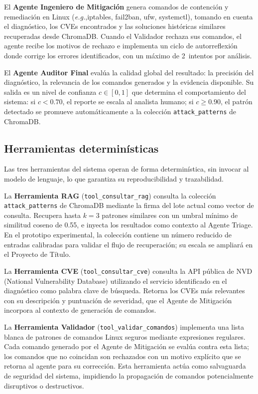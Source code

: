El \textbf{Agente Ingeniero de Mitigación} genera comandos
de contención y remediación en Linux (\textit{e.g.},iptables, fail2ban, ufw,
systemctl), tomando en cuenta el diagnóstico, los CVEs
encontrados y las soluciones históricas similares recuperadas
desde ChromaDB. Cuando el Validador rechaza sus comandos, el
agente recibe los motivos de rechazo e implementa un ciclo de
autorreflexión donde corrige los errores identificados, con un
máximo de 2~intentos por análisis.

El \textbf{Agente Auditor Final} evalúa la calidad global del
resultado: la precisión del diagnóstico, la relevancia de los
comandos generados y la evidencia disponible. Su salida es un
nivel de confianza $c \in [0,1]$ que determina el
comportamiento del sistema: si $c < 0.70$, el reporte se
escala al analista humano; si $c \geq 0.90$, el patrón
detectado se promueve automáticamente a la colección
\texttt{attack\_patterns} de ChromaDB.

\subsection{Herramientas determinísticas}

Las tres herramientas del sistema operan de forma
determinística, sin invocar al modelo de lenguaje, lo que
garantiza su reproducibilidad y trazabilidad.

La \textbf{Herramienta RAG} (\texttt{tool\_consultar\_rag})
consulta la colección \texttt{attack\_patterns} de ChromaDB
mediante la firma del lote actual como vector de consulta.
Recupera hasta $k=3$ patrones similares con un umbral mínimo
de similitud coseno de 0.55, e inyecta los resultados como
contexto al Agente Triage. En el prototipo experimental, la
colección contiene un número reducido de entradas calibradas
para validar el flujo de recuperación; su escala se ampliará
en el Proyecto de Título.

La \textbf{Herramienta CVE} (\texttt{tool\_consultar\_cve})
consulta la API pública de NVD (National Vulnerability
Database) utilizando el servicio identificado en el diagnóstico
como palabra clave de búsqueda. Retorna los CVEs más relevantes
con su descripción y puntuación de severidad, que el Agente de
Mitigación incorpora al contexto de generación de comandos.

La \textbf{Herramienta Validador} (\texttt{tool\_validar\_comandos})
implementa una lista blanca de patrones de comandos Linux
seguros mediante expresiones regulares. Cada comando generado
por el Agente de Mitigación se evalúa contra esta lista; los
comandos que no coincidan son rechazados con un motivo
explícito que se retorna al agente para su corrección. Esta
herramienta actúa como salvaguarda de seguridad del sistema,
impidiendo la propagación de comandos potencialmente
disruptivos o destructivos.

